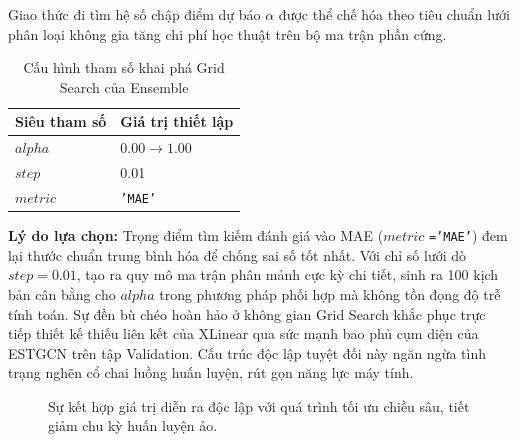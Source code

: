 Giao thức đi tìm hệ số chập điểm dự báo $\alpha$ được thể chế hóa theo tiêu chuẩn lưới phân loại không gia tăng chi phí học thuật trên bộ ma trận phần cứng.

\begin{table}[H]
    \centering
    \caption{Cấu hình tham số khai phá Grid Search của Ensemble}
    \label{tab:ensemble_gs_params}
    \renewcommand{\arraystretch}{1.3}
    \begin{tabular}{p{5.5cm} p{8.8cm}}
    \toprule
    \textbf{Siêu tham số} & \textbf{Giá trị thiết lập} \\
    \midrule
    $alpha$ & $0.00 \to 1.00$ \\
    $step$ & 0.01 \\
    $metric$ & \texttt{'MAE'} \\
    \bottomrule
    \end{tabular}
\end{table}

\textbf{Lý do lựa chọn:} Trọng điểm tìm kiếm đánh giá vào MAE ($metric$ \texttt{='MAE'}) đem lại thước chuẩn trung bình hóa để chống sai số tốt nhất. Với chỉ số lưới dò $step = 0.01$, tạo ra quy mô ma trận phân mảnh cực kỳ chi tiết, sinh ra 100 kịch bản cân bằng cho $alpha$ trong phương pháp phối hợp mà không tồn đọng độ trễ tính toán. Sự đền bù chéo hoàn hảo ở không gian Grid Search khắc phục trực tiếp thiết kế thiếu liên kết của XLinear qua sức mạnh bao phủ cụm diện của ESTGCN trên tập Validation. Cấu trúc độc lập tuyệt đối này ngăn ngừa tình trạng nghẽn cổ chai luồng huấn luyện, rút gọn năng lực máy tính.

\begin{figure}[H]
    \centering
    \caption{Quy trình vận hành trực tiếp của Ensemble}
    \caption*{Sự kết hợp giá trị diễn ra độc lập với quá trình tối ưu chiều sâu, tiết giảm chu kỳ huấn luyện ảo.}
    \label{fig:quy_trinh_ensemble}
\end{figure}

